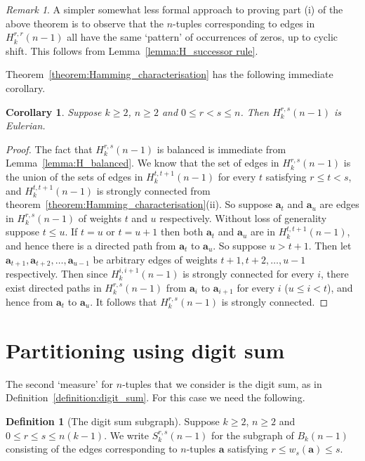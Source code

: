 \documentclass[a4paper,11pt]{article}
\theoremstyle{plain}
\newtheorem{corollary}[lemma]{Corollary}
\theoremstyle{definition}
\newtheorem{definition}{Definition}[section]
\theoremstyle{remark}
\newtheorem{remark}{Remark}[section]
\begin{document}
\begin{remark}
A simpler somewhat less formal approach to proving part (i) of the above theorem is to observe that
the $n$-tuples corresponding to edges in $H_k^{r,r}(n-1)$ all have the same `pattern' of
occurrences of zeros, up to cyclic shift.  This follows from Lemma~\ref{lemma:H_successor rule}.
\end{remark}

Theorem~\ref{theorem:Hamming_characterisation} has the following immediate corollary.

\begin{corollary}  \label{corollary:H_characterisation}
Suppose $k\geq2$, $n\geq 2$ and $0\leq r<s\leq n$. Then $H_k^{r,s}(n-1)$ is Eulerian.
\end{corollary}

\begin{proof}
The fact that $H_k^{r,s}(n-1)$ is balanced is immediate from Lemma~\ref{lemma:H_balanced}. We know
that the set of edges in $H_k^{r,s}(n-1)$ is the union of the sets of edges in $H_k^{t,t+1}(n-1)$
for every $t$ satisfying $r\leq t<s$, and $H_k^{t,t+1}(n-1)$ is strongly connected from
theorem~\ref{theorem:Hamming_characterisation}(ii).  So suppose $\mathbf{a}_t$ and $\mathbf{a}_u$
are edges in $H_k^{r,s}(n-1)$ of weights $t$ and $u$ respectively.  Without loss of generality
suppose $t\leq u$.  If $t=u$ or $t=u+1$ then both $\mathbf{a}_t$ and $\mathbf{a}_u$ are in
$H_k^{t,t+1}(n-1)$, and hence there is a directed path from $\mathbf{a}_t$ to $\mathbf{a}_u$. So
suppose $u>t+1$.  Then let $\mathbf{a}_{t+1},\mathbf{a}_{t+2},\dots,\mathbf{a}_{u-1}$ be arbitrary
edges of weights $t+1,t+2,\dots,u-1$ respectively.  Then since $H_k^{i,i+1}(n-1)$ is strongly
connected for every $i$, there exist directed paths in $H_k^{r,s}(n-1)$ from $\mathbf{a}_i$ to
$\mathbf{a}_{i+1}$ for every $i$ ($u\leq i<t$), and hence from $\mathbf{a}_t$ to $\mathbf{a}_u$. It
follows that $H_k^{r,s}(n-1)$ is strongly connected.
\end{proof}

\section{Partitioning using digit sum}

The second `measure' for $n$-tuples that we consider is the digit sum, as in
Definition~\ref{definition:digit_sum}.  For this case we need the following.

\begin{definition}[The digit sum subgraph]
Suppose $k\geq2$, $n\geq 2$ and $0\leq r\leq s\leq n(k-1)$. We write $S_k^{r,s}(n-1)$ for the
subgraph of $B_k(n-1)$ consisting of the edges corresponding to $n$-tuples $\mathbf{a}$ satisfying
$r\leq w_s(\mathbf{a})\leq s$.
\end{definition}
\end{document}
